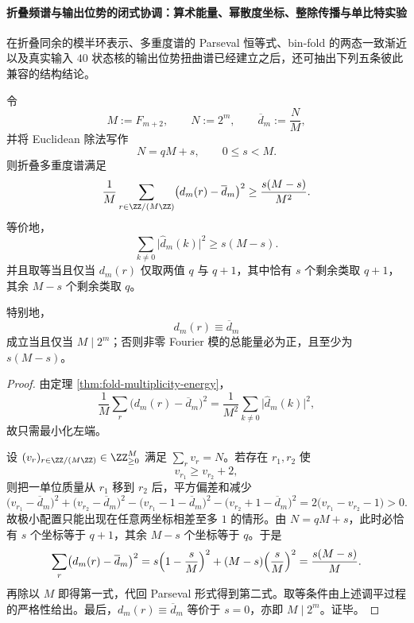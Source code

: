 \paragraph{折叠频谱与输出位势的闭式协调：算术能量、幂散度坐标、整除传播与单比特实验}
在折叠同余的模半环表示、多重度谱的 Parseval 恒等式、bin-fold 的两态一致渐近以及真实输入 \(40\) 状态核的输出位势扭曲谱已经建立之后，还可抽出下列五条彼此兼容的结构结论。

\begin{conclusion}\label{con:xi-time-part9l-fold-fourier-energy-arithmetic-lower-bound}
令
\[
M:=F_{m+2},\qquad N:=2^m,\qquad \overline d_m:=\frac{N}{M},
\]
并将 Euclidean 除法写作
\[
N=qM+s,\qquad 0\le s<M.
\]
则折叠多重度谱满足
\[
\frac{1}{M}\sum_{r\in\ZZ/(M\ZZ)}\bigl(d_m(r)-\overline d_m\bigr)^2
\ge
\frac{s(M-s)}{M^2}.
\]
等价地，
\[
\sum_{k\ne 0}\bigl|\widehat d_m(k)\bigr|^2\ge s(M-s).
\]
并且取等当且仅当 \(d_m(r)\) 仅取两值 \(q\) 与 \(q+1\)，其中恰有 \(s\) 个剩余类取 \(q+1\)，其余 \(M-s\) 个剩余类取 \(q\)。

特别地，
\[
d_m(r)\equiv \overline d_m
\]
成立当且仅当 \(M\mid 2^m\)；否则非零 Fourier 模的总能量必为正，且至少为 \(s(M-s)\)。
\end{conclusion}
\begin{proof}
由定理 \ref{thm:fold-multiplicity-energy}，
\[
\frac{1}{M}\sum_r\bigl(d_m(r)-\overline d_m\bigr)^2
=
\frac{1}{M^2}\sum_{k\ne 0}\bigl|\widehat d_m(k)\bigr|^2,
\]
故只需最小化左端。

设 \((v_r)_{r\in\ZZ/(M\ZZ)}\in\ZZ_{\ge 0}^{M}\) 满足 \(\sum_r v_r=N\)。若存在 \(r_1,r_2\) 使
\[
v_{r_1}\ge v_{r_2}+2,
\]
则把一单位质量从 \(r_1\) 移到 \(r_2\) 后，平方偏差和减少
\[
\bigl(v_{r_1}-\overline d_m\bigr)^2+\bigl(v_{r_2}-\overline d_m\bigr)^2
-\bigl(v_{r_1}-1-\overline d_m\bigr)^2
-\bigl(v_{r_2}+1-\overline d_m\bigr)^2
=2\bigl(v_{r_1}-v_{r_2}-1\bigr)>0.
\]
故极小配置只能出现在任意两坐标相差至多 \(1\) 的情形。由 \(N=qM+s\)，此时必恰有 \(s\) 个坐标等于 \(q+1\)，其余 \(M-s\) 个坐标等于 \(q\)。于是
\[
\sum_r\bigl(d_m(r)-\overline d_m\bigr)^2
=
s\Bigl(1-\frac{s}{M}\Bigr)^2+(M-s)\Bigl(\frac{s}{M}\Bigr)^2
=
\frac{s(M-s)}{M}.
\]
再除以 \(M\) 即得第一式，代回 Parseval 形式得到第二式。取等条件由上述调平过程的严格性给出。最后，\(d_m(r)\equiv \overline d_m\) 等价于 \(s=0\)，亦即 \(M\mid 2^m\)。证毕。
\end{proof}

